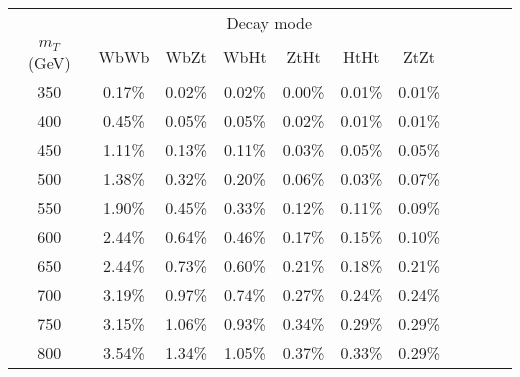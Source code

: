 \begin{tabular}{c c c c c c c c c c c } \toprule
 & \multicolumn{6}{c}{ Decay mode } \\
 $m_{T}$ (GeV)  & WbWb 		 & WbZt 		 & WbHt 		 & ZtHt 		 & HtHt 		 & ZtZt 		 \\ \midrule 
 350 & 0.17\% & 0.02\% & 0.02\% & 0.00\% & 0.01\% & 0.01\%\\ 
400 & 0.45\% & 0.05\% & 0.05\% & 0.02\% & 0.01\% & 0.01\%\\ 
450 & 1.11\% & 0.13\% & 0.11\% & 0.03\% & 0.05\% & 0.05\%\\ 
500 & 1.38\% & 0.32\% & 0.20\% & 0.06\% & 0.03\% & 0.07\%\\ 
550 & 1.90\% & 0.45\% & 0.33\% & 0.12\% & 0.11\% & 0.09\%\\ 
600 & 2.44\% & 0.64\% & 0.46\% & 0.17\% & 0.15\% & 0.10\%\\ 
650 & 2.44\% & 0.73\% & 0.60\% & 0.21\% & 0.18\% & 0.21\%\\ 
700 & 3.19\% & 0.97\% & 0.74\% & 0.27\% & 0.24\% & 0.24\%\\ 
750 & 3.15\% & 1.06\% & 0.93\% & 0.34\% & 0.29\% & 0.29\%\\ 
800 & 3.54\% & 1.34\% & 1.05\% & 0.37\% & 0.33\% & 0.29\%\\ 
\bottomrule\end{tabular}